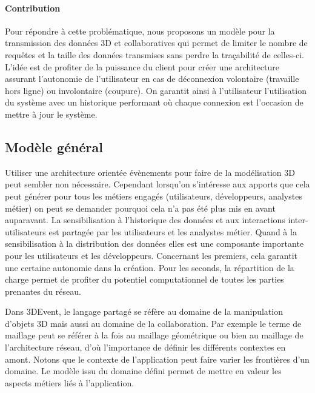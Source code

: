 \paragraph{Contribution}
Pour répondre à cette problématique, nous proposons un modèle pour la 
transmission des données 3D et collaboratives qui permet de  limiter  le nombre 
de requêtes et la taille des données transmises sans perdre la traçabilité de 
celles-ci. L'idée est de profiter de la puissance du client pour créer une 
architecture assurant l'autonomie de l'utilisateur en cas de déconnexion volontaire 
(travaille hors ligne) ou involontaire (coupure). On garantit ainsi à l'utilisateur 
l'utilisation du système avec un historique performant où chaque connexion est 
l'occasion de mettre à jour le système.


\subsection{Modèle général}
Utiliser une architecture orientée évènements pour faire de la modélisation 3D peut 
sembler non nécessaire. Cependant lorsqu'on s'intéresse aux apports que cela 
peut générer pour tous les métiers engagés (utilisateurs, développeurs, analystes 
métier) on peut se demander pourquoi cela n'a pas été plus mis en avant 
auparavant. La sensibilisation à l'historique des 
données et aux interactions 
inter-utilisateurs est partagée par les utilisateurs et les analystes métier. Quand à 
la sensibilisation à la distribution des données elles est une composante 
importante pour les utilisateurs et les développeurs. Concernant les premiers, cela 
garantit une certaine autonomie dans la création. Pour les seconds, la répartition 
de la charge permet de profiter du potentiel computationnel de toutes les parties 
prenantes du réseau. 

Dans 3DEvent, le langage partagé se réfère au domaine de la manipulation 
d'objets 3D mais aussi au domaine de la collaboration. Par exemple le terme de 
maillage peut se référer à la fois au maillage géométrique ou bien au maillage de 
l'architecture réseau, d'où l'importance de définir les différents contextes en amont. 
Notons que le contexte de l'application peut faire varier les frontières d'un 
domaine. Le modèle issu du domaine défini permet de mettre en valeur les 
aspects métiers liés à l'application.

